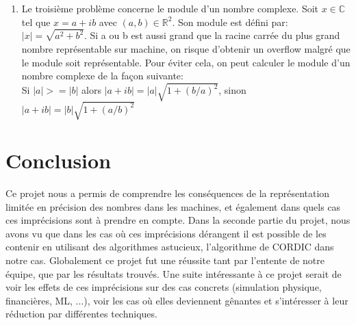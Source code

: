 \documentclass{article}
\begin{document}
\begin{enumerate}
\begin{enumerate}
            \item
            Le troisième problème concerne le module d'un nombre complexe.
            Soit $x \in \mathbb{C}$ tel que $x=a+ib$ avec $(a,b) \in \mathbb{R}^2$. Son module est défini par: $|x|=\sqrt{a^2+b^2}$. Si a ou b est aussi grand que la racine carrée du plus grand nombre représentable sur machine, on risque d'obtenir un overflow malgré que le module soit représentable. Pour éviter cela, on peut calculer le module d'un nombre complexe de la façon suivante:
            \\Si $|a|>=|b|$ alors $|a+ib|=|a|\sqrt{1+(b/a)^2}$, sinon $|a+ib|=|b|\sqrt{1+(a/b)^2}$ 
        \end{enumerate}
\end{enumerate}




\section{Conclusion}
    Ce projet nous a permis de comprendre les conséquences de la représentation limitée  en précision des nombres dans les machines, et également dans quels cas ces imprécisions sont à prendre en compte. Dans la seconde partie du projet, nous avons vu que dans les cas où ces imprécisions dérangent il est possible de les contenir en utilisant des algorithmes astucieux, l'algorithme de CORDIC dans notre cas.
    Globalement ce projet fut une réussite tant par l'entente de notre équipe, que par les résultats trouvés.
    Une suite intéressante à ce projet serait de voir les effets de ces imprécisions sur des cas concrets (simulation physique, financières, ML, ...), voir les cas où elles deviennent gênantes et s'intéresser à leur réduction par différentes techniques.
\end{document}
